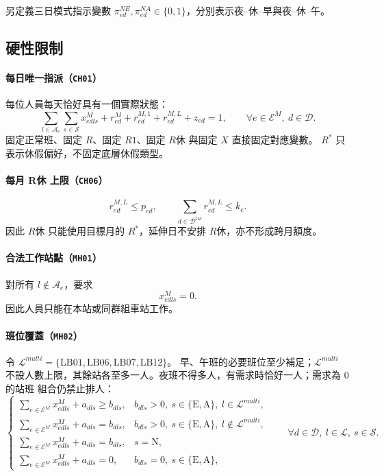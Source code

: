 \documentclass[a4paper,12pt]{article}
\begin{document}
另定義三日模式指示變數
\(\pi^{NE}_{ed},\pi^{NA}_{ed}\in\{0,1\}\)，分別表示夜--休--早與夜--休--午。

\subsection{硬性限制}

\paragraph{每日唯一指派（\texttt{CH01}）}
每位人員每天恰好具有一個實際狀態：
\[
  \sum_{l\in\mathcal{A}_e}\sum_{s\in\mathcal{S}}x^{M}_{edls}
  +r^{M}_{ed}+r^{M,1}_{ed}+r^{M,L}_{ed}+z_{ed}=1,
  \qquad
  \forall e\in\mathcal{E}^{M},\ d\in\mathcal{D}.
\]
固定正常班、固定 \(R\)、固定 \(R1\)、固定 \(R休\) 與固定 \(X\) 直接固定對應變數。
\(R^*\) 只表示休假偏好，不固定底層休假類型。

\paragraph{每月 R休 上限（\texttt{CH06}）}
\[
  r^{M,L}_{ed}\leq p_{ed},
  \qquad
  \sum_{d\in\mathcal{D}^{\mathrm{tar}}}r^{M,L}_{ed}\leq k_e.
\]
因此 \(R休\) 只能使用目標月的 \(R^*\)，延伸日不安排 \(R休\)，亦不形成跨月額度。

\paragraph{合法工作站點（\texttt{MH01}）}
對所有 \(l\notin\mathcal{A}_e\)，要求
\[
  x^{M}_{edls}=0.
\]
因此人員只能在本站或同群組車站工作。

\paragraph{班位覆蓋（\texttt{MH02}）}
令 \(\mathcal L^{multi}=\{\mathrm{LB01},\mathrm{LB06},\mathrm{LB07},\mathrm{LB12}\}\)。
早、午班的必要班位至少補足；\(\mathcal L^{multi}\) 不設人數上限，其餘站各至多一人。夜班不得多人，有需求時恰好一人；需求為 0 的站班
組合仍禁止排人：
\[
  \begin{cases}
    \displaystyle\sum_{e\in\mathcal{E}^{M}}x^{M}_{edls}+a_{dls}\geq b_{dls},
    & b_{dls}>0,\ s\in\{\mathrm E,\mathrm A\},\ l\in\mathcal L^{multi},\\
    \displaystyle\sum_{e\in\mathcal{E}^{M}}x^{M}_{edls}+a_{dls}=b_{dls},
    & b_{dls}>0,\ s\in\{\mathrm E,\mathrm A\},\ l\notin\mathcal L^{multi},\\
    \displaystyle\sum_{e\in\mathcal{E}^{M}}x^{M}_{edls}+a_{dls}=b_{dls},
    & s=\mathrm N,\\
    \displaystyle\sum_{e\in\mathcal{E}^{M}}x^{M}_{edls}+a_{dls}=0,
    & b_{dls}=0,\ s\in\{\mathrm E,\mathrm A\},
  \end{cases}
  \qquad
  \forall d\in\mathcal{D},\ l\in\mathcal{L},\ s\in\mathcal{S}.
\]
\end{document}
